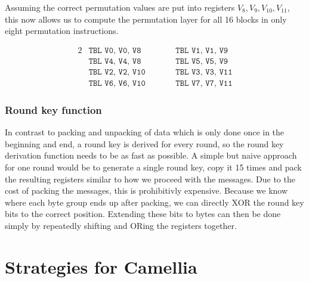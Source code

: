Assuming the correct permutation values are put into registers
$V_8,V_9,V_{10},V_{11}$, this now allows us to compute the permutation layer
for all 16 blocks in only eight permutation instructions.

\begin{alignat*}{2}
    &\texttt{TBL V0, V0, V8}\qquad &&\texttt{TBL V1, V1, V9} \\
    &\texttt{TBL V4, V4, V8}\qquad &&\texttt{TBL V5, V5, V9} \\
    &\texttt{TBL V2, V2, V10}\qquad &&\texttt{TBL V3, V3, V11} \\
    &\texttt{TBL V6, V6, V10}\qquad &&\texttt{TBL V7, V7, V11}
\end{alignat*}

\subsubsection{Round key function}

In contrast to packing and unpacking of data which is only done once in the
beginning and end, a round key is derived for every round, so the round key
derivation function needs to be as fast as possible. A simple but naive
approach for one round would be to generate a single round key, copy it 15
times and pack the resulting registers similar to how we proceed with the
messages. Due to the cost of packing the messages, this is prohibitivly
expensive. Because we know where each byte group ends up after packing, we can
directly XOR the round key bits to the correct position. Extending these bits
to bytes can then be done simply by repeatedly shifting and ORing the registers
together.

\section{Strategies for Camellia}
